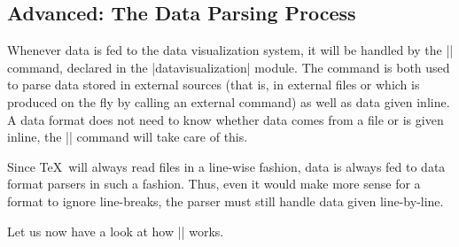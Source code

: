 \subsection{Advanced: The Data Parsing Process}

\label{section-dv-parsing}

Whenever data is fed to the data visualization system, it will be
handled by the |\pgfdata| command, declared in the |datavisualization|
module. The command is both used to parse data stored in external
sources (that is, in external files or which is produced on the fly by
calling an external command) as well as data given inline. A data
format does not need to know whether data comes from a file or is
given inline, the |\pgfdata| command will take care of this.

Since \TeX\ will always read files in a line-wise fashion, data is
always fed to data format parsers in such a fashion. Thus, even it
would make more sense for a format to ignore line-breaks, the parser
must still handle data given line-by-line.

Let us now have a look at how |\pgfdata| works.


